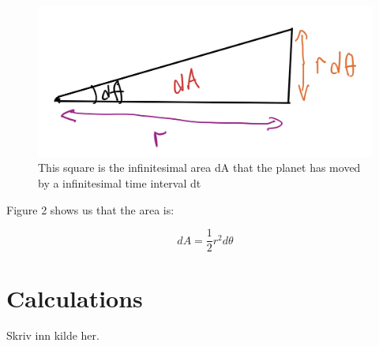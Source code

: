 \documentclass{article}
\begin{document}
\begin{multicols}{2}
\begin{figure}[H]
	\centering
	\includegraphics[width=\linewidth]{sketch.jpg}
	\caption{This square is the infinitesimal area dA that the planet has moved by a infinitesimal time interval dt}
	\label{fig:1bplot}
\end{figure}


Figure 2 shows us that the area is:

\begin{equation}
    dA=\frac{1}{2}r^2d\theta
\label{eq:dA}
\end{equation}

\end{multicols}

\clearpage

\appendix %

\section{Calculations} 

\begin{thebibliography}{9}
	Skriv inn kilde her.
\end{thebibliography}
\end{document}
